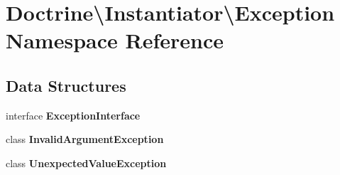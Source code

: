 \section{Doctrine\textbackslash{}Instantiator\textbackslash{}Exception Namespace Reference}
\label{namespace_doctrine_1_1_instantiator_1_1_exception}
\subsection*{Data Structures}
\begin{DoxyCompactItemize}
\item 
interface {\bf Exception\+Interface}
\item 
class {\bf Invalid\+Argument\+Exception}
\item 
class {\bf Unexpected\+Value\+Exception}
\end{DoxyCompactItemize}
